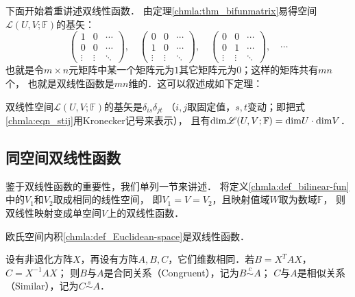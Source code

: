 下面开始着重讲述双线性函数．
由定理\ref{chmla:thm_bifunmatrix}易得空间$\mathscr{L}(U,V;\mathbb{F})$的基矢：
\begin{equation}\label{chmla:eqn_stij}
    \begin{pmatrix}
        1 & 0& \cdots  \\
        0 & 0& \cdots \\
        \vdots & \vdots & \ddots
    \end{pmatrix},\quad
    \begin{pmatrix}
    0 & 0& \cdots  \\
    1 & 0& \cdots \\
    \vdots & \vdots & \ddots
\end{pmatrix},\quad
    \begin{pmatrix}
    0 & 0& \cdots  \\
    0 & 1& \cdots \\
    \vdots & \vdots & \ddots
\end{pmatrix},\quad \cdots
\end{equation}
也就是令$m\times n$元矩阵中某一个矩阵元为$1$其它矩阵元为$0$；这样的矩阵共有$mn$个，
也就是双线性函数是$mn$维的．这可以叙述成如下定理：
\begin{theorem}\label{chmla:thm_uvwd}
双线性空间$\mathscr{L}(U,V;\mathbb{F})$的基矢是$\delta_{is} \delta_{jt} $
（$i,j$取固定值，$s,t$变动；即把式\eqref{chmla:eqn_stij}用Kronecker记号来表示），
且有${\rm dim} \mathscr{L}(U,V;\mathbb{F}) = {\rm dim}U \cdot {\rm dim}V $．
\end{theorem}




\subsection{同空间双线性函数}\label{chmla:sec_double-linear-function}
鉴于双线性函数的重要性，我们单列一节来讲述．
将定义\ref{chmla:def_bilinear-fun}中的$V_1$和$V_2$取成相同的线性空间，
即$V_1 = V =V_2$，且映射值域$W$取为数域$\mathbb{F}$，
则双线性映射变成单空间$V$上的双线性函数．

\begin{example}
    欧氏空间内积\ref{chmla:def_Euclidean-space}是双线性函数．
\end{example}

\begin{definition}
    设有非退化方阵$X$，再设有方阵$A,B,C$，它们维数相同．若$B= X^T A X$，$C= X^{-1} A X$；
    则$B$与$A$是{\heiti 合同关系}（Congruent），记为$B\overset{c}{\sim} A$；
    $C$与$A$是{\heiti 相似关系}（Similar），记为$C\overset{s}{\sim} A$．    
\end{definition}


